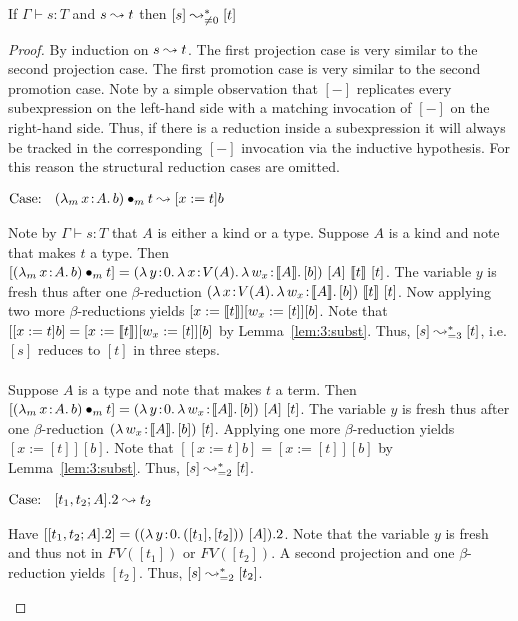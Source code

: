 \begin{lemma}
    \label{lem:3:reduction_bounded}
    If $\Gamma \vdash s : T$ and $s \leadsto t$ then $[s] \leadsto^*_{\neq 0} [t]$
\end{lemma}
\begin{proof}
    By induction on $s \leadsto t$.
    The first projection case is very similar to the second projection case.
    The first promotion case is very similar to the second promotion case.
    Note by a simple observation that $[-]$ replicates every subexpression on the left-hand side with a matching invocation of $[-]$ on the right-hand side.
    Thus, if there is a reduction inside a subexpression it will always be tracked in the corresponding $[-]$ invocation via the inductive hypothesis.
    For this reason the structural reduction cases are omitted.

    $\text{Case: }\begin{array}{c} ({\lambda_m}\, x\! : \! A.\, b) \bullet_{m} t \leadsto [x := t]b \end{array}$
    \begin{proofcase}
        Note by $\Gamma \vdash s : T$ that $A$ is either a kind or a type.
        Suppose $A$ is a kind and note that makes $t$ a type.
        Then $[\app{(\abs{\lambda_m}{x}{A}{b})}{m}{t}] = (\abs{\lambda}{y}{0}{\abs{\lambda}{x}{V(A)}{\abs{\lambda}{w_x}{\sema{A}}{[b]}}}) \ [A]\ \sema{t}\ [t]$.
        The variable $y$ is fresh thus after one $\beta$-reduction $(\abs{\lambda}{x}{V(A)}{\abs{\lambda}{w_x}{\sema{A}}{[b]}})\ \sema{t}\ [t]$.
        Now applying two more $\beta$-reductions yields $[x := \llbracket t \rrbracket][w_x := [t]][b]$.
        Note that $[[x := t]b] = [x := \llbracket t \rrbracket][w_x := [t]][b]$ by Lemma~\ref{lem:3:subst}.
        Thus, $[s] \leadsto^*_{=3} [t]$, i.e. $[s]$ reduces to $[t]$ in three steps.
        \\ \\
        Suppose $A$ is a type and note that makes $t$ a term.
        Then $[\app{(\abs{\lambda_m}{x}{A}{b})}{m}{t}] = (\abs{\lambda}{y}{0}{\abs{\lambda}{w_x}{\sema{A}}{[b]}}) \ [A]\ [t]$.
        The variable $y$ is fresh thus after one $\beta$-reduction $(\abs{\lambda}{w_x}{\sema{A}}{[b]})\ [t]$.
        Applying one more $\beta$-reduction yields $[x := [t]][b]$.
        Note that $[[x := t]b] = [x := [t]][b]$ by Lemma~\ref{lem:3:subst}.
        Thus, $[s] \leadsto^*_{=2} [t]$.
    \end{proofcase}

    $\text{Case: }\begin{array}{c} [t_1, t_2; A].2 \leadsto t_2 \end{array}$
    \begin{proofcase}
        Have $[[t_1, t_2; A].2] = (({\lambda}\, y\! : \! 0.\, ([t_1], [t_2]))\ [A]).2$.
        Note that the variable $y$ is fresh and thus not in $FV([t_1])$ or $FV([t_2])$.
        A second projection and one $\beta$-reduction yields $[t_2]$.
        Thus, $[s] \leadsto^*_{=2} [t_2]$.
    \end{proofcase}
    

\end{proof}
